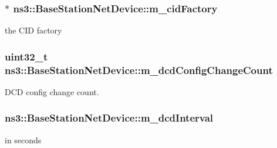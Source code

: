 \subsubsection[{\texorpdfstring{m\+\_\+cid\+Factory}{m_cidFactory}}]{$\ast$ ns3\+::\+Base\+Station\+Net\+Device\+::m\+\_\+cid\+Factory\hspace{0.3cm}{\ttfamily [private]}}\hypertarget{classns3_1_1BaseStationNetDevice_a40be478b4658b283435187caccba30ff}{}\label{classns3_1_1BaseStationNetDevice_a40be478b4658b283435187caccba30ff}


the C\+ID factory 

\subsubsection[{\texorpdfstring{m\+\_\+dcd\+Config\+Change\+Count}{m_dcdConfigChangeCount}}]{\setlength{\rightskip}{0pt plus 5cm}uint32\+\_\+t ns3\+::\+Base\+Station\+Net\+Device\+::m\+\_\+dcd\+Config\+Change\+Count\hspace{0.3cm}{\ttfamily [private]}}\hypertarget{classns3_1_1BaseStationNetDevice_abcdaea98567567d67375bea8eb9cfb56}{}\label{classns3_1_1BaseStationNetDevice_abcdaea98567567d67375bea8eb9cfb56}


D\+CD config change count. 

\subsubsection[{\texorpdfstring{m\+\_\+dcd\+Interval}{m_dcdInterval}}]{ ns3\+::\+Base\+Station\+Net\+Device\+::m\+\_\+dcd\+Interval\hspace{0.3cm}{\ttfamily [private]}}\hypertarget{classns3_1_1BaseStationNetDevice_a110c3258d57e4ddf85bb0b8f27d684e9}{}\label{classns3_1_1BaseStationNetDevice_a110c3258d57e4ddf85bb0b8f27d684e9}


in seconds 

